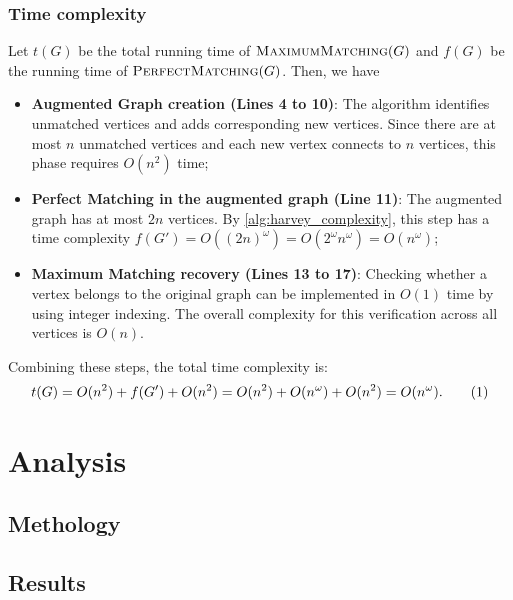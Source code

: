 \subsubsection{Time complexity}
\noindent
Let \(t(G)\) be the total running time of \(\textsc{MaximumMatching}(G)\) and \(f(G)\) be the running time of \(\textsc{PerfectMatching}(G)\). Then, we have
\begin{itemize}
\item \textbf{Augmented Graph creation (Lines 4 to 10)}:
The algorithm identifies unmatched vertices and adds corresponding new vertices. 
Since there are at most \(n\) unmatched vertices and each new vertex connects to \(n\) vertices, this phase requires \(O(n^2)\) time;

\item \textbf{Perfect Matching in the augmented graph (Line 11)}: 
The augmented graph has at most \(2n\) vertices. 
By \cref{alg:harvey_complexity}, this step has a time complexity  \(f(G') = O((2n)^\omega) = O(2^\omega n^\omega) = O(n^\omega)\);

\item \textbf{Maximum Matching recovery (Lines 13 to 17)}: 
Checking whether a vertex belongs to the original graph can be implemented in \(O(1)\) time by using integer indexing. 
The overall complexity for this verification across all vertices is \(O(n)\).
\end{itemize}
Combining these steps, the total time complexity is:
\[
t(G) = O(n^2) + f(G') + O(n^2) = O(n^2) + O(n^\omega) + O(n^2) = O(n^\omega). \numberthis \label{alg:maximum_matching_complexity}
\]

\section{Analysis}

\subsection{Methology}

\subsection{Results}

